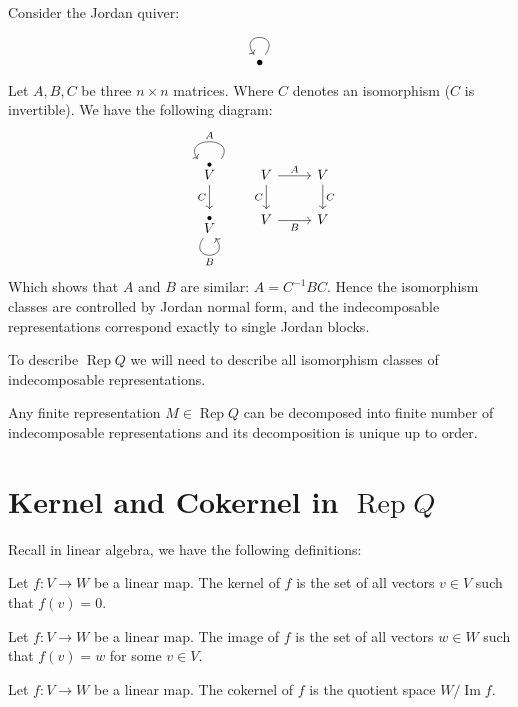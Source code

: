 \documentclass[11pt, a4paper]{report}
\begin{document}
\begin{example}
Consider the Jordan quiver:
\[
\begin{tikzcd}
\bullet \arrow[loop, distance=2em, in=125, out=55]
\end{tikzcd}
\]
Let $A,B,C$ be three $n \times n$ matrices. Where $C$ denotes an isomorphism ($C$ is invertible). We have the following diagram:
\[
    \begin{tikzcd}
        \overset{\bullet}{V} \arrow["A"', loop, distance=2em, in=125, out=55] \arrow[d, "C"'] \\
        \overset{\bullet}{V} \arrow["B"', loop, distance=2em, in=305, out=235]               
        \end{tikzcd}
\ \ \ 
\begin{tikzcd}
    V \arrow[r, "A"] \arrow[d, "C"'] & V \arrow[d, "C"] \\
    V \arrow[r, "B"']                & V               
    \end{tikzcd}
\]
Which shows that $A$ and $B$ are similar: $A = C^{-1} B C$. Hence the isomorphism classes are controlled by Jordan normal form, and the indecomposable representations correspond exactly to single Jordan blocks.
\end{example}

To describe $\operatorname{Rep}Q$ we will need to describe all isomorphism classes of indecomposable representations.

\begin{theorem}
Any finite representation $M \in \operatorname{Rep}Q$ can be decomposed into finite number of indecomposable representations and its decomposition is unique up to order.
\end{theorem}

\section{Kernel and Cokernel in \texorpdfstring{$\operatorname{Rep}Q$}{Rep Q}}

Recall in linear algebra, we have the following definitions:
\begin{definition}
    Let $f: V \to W$ be a linear map. The kernel of $f$ is the set of all vectors $v \in V$ such that $f(v) = 0$.
\end{definition}
\begin{definition}
    Let $f: V \to W$ be a linear map. The image of $f$ is the set of all vectors $w \in W$ such that $f(v) = w$ for some $v \in V$.
\end{definition}
\begin{definition}
    Let $f: V \to W$ be a linear map. The cokernel of $f$ is the quotient space $W / \operatorname{Im} f$.
\end{definition}
\end{document}
